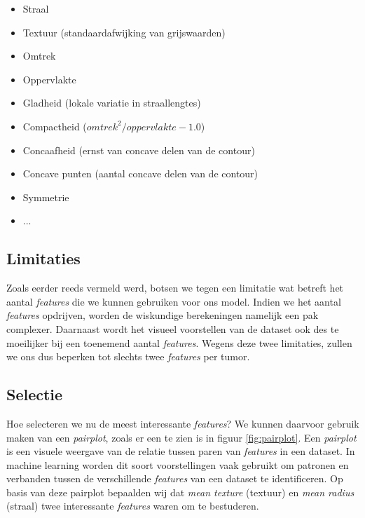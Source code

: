 \documentclass[twoside, kulak]{kulakreport}
\begin{document}
	\begin{itemize}
		\item Straal
		\item Textuur (standaardafwijking van grijswaarden)
		\item Omtrek
		\item Oppervlakte
		\item Gladheid (lokale variatie in straallengtes)
		\item Compactheid (\(omtrek^2 / oppervlakte - 1.0\))
		\item Concaafheid (ernst van concave delen van de contour)
		\item Concave punten (aantal concave delen van de contour)
		\item Symmetrie
		\item ...
	\end{itemize}
	
	\subsection{Limitaties}
	
	Zoals eerder reeds vermeld werd, botsen we tegen een limitatie wat betreft het aantal \textit{features} die we kunnen gebruiken voor ons model. Indien we het aantal \textit{features} opdrijven, worden de wiskundige berekeningen namelijk een pak complexer. Daarnaast wordt het visueel voorstellen van de dataset ook des te moeilijker bij een toenemend aantal \textit{features}. Wegens deze twee limitaties, zullen we ons dus beperken tot slechts twee \textit{features} per tumor.
	
	\subsection{Selectie}
	
	Hoe selecteren we nu de meest interessante \textit{features}? We kunnen daarvoor gebruik maken van een \textit{pairplot}, zoals er een te zien is in figuur \ref{fig:pairplot}. Een \textit{pairplot} is een visuele weergave van de relatie tussen paren van \textit{features} in een dataset. In machine learning worden dit soort voorstellingen vaak gebruikt om patronen en verbanden tussen de verschillende \textit{features} van een dataset te identificeren. Op basis van deze pairplot bepaalden wij dat \textit{mean texture} (textuur) en \textit{mean radius} (straal) twee interessante \textit{features} waren om te bestuderen.
	
\end{document}
